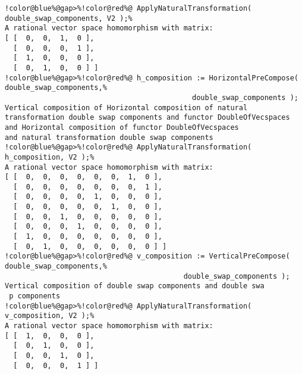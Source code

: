 \begin{Verbatim}[commandchars=!@\%,frame=single]
!color@blue%@gap>%!color@red%@ ApplyNaturalTransformation( double_swap_components, V2 );%
A rational vector space homomorphism with matrix: 
[ [  0,  0,  1,  0 ],
  [  0,  0,  0,  1 ],
  [  1,  0,  0,  0 ],
  [  0,  1,  0,  0 ] ]
!color@blue%@gap>%!color@red%@ h_composition := HorizontalPreCompose( double_swap_components,%
                                            double_swap_components );
Vertical composition of Horizontal composition of natural
transformation double swap components and functor DoubleOfVecspaces
and Horizontal composition of functor DoubleOfVecspaces
and natural transformation double swap components
!color@blue%@gap>%!color@red%@ ApplyNaturalTransformation( h_composition, V2 );%
A rational vector space homomorphism with matrix: 
[ [  0,  0,  0,  0,  0,  0,  1,  0 ],
  [  0,  0,  0,  0,  0,  0,  0,  1 ],
  [  0,  0,  0,  0,  1,  0,  0,  0 ],
  [  0,  0,  0,  0,  0,  1,  0,  0 ],
  [  0,  0,  1,  0,  0,  0,  0,  0 ],
  [  0,  0,  0,  1,  0,  0,  0,  0 ],
  [  1,  0,  0,  0,  0,  0,  0,  0 ],
  [  0,  1,  0,  0,  0,  0,  0,  0 ] ]
!color@blue%@gap>%!color@red%@ v_composition := VerticalPreCompose( double_swap_components,%
                                          double_swap_components );
Vertical composition of double swap components and double swa
 p components
!color@blue%@gap>%!color@red%@ ApplyNaturalTransformation( v_composition, V2 );%
A rational vector space homomorphism with matrix: 
[ [  1,  0,  0,  0 ],
  [  0,  1,  0,  0 ],
  [  0,  0,  1,  0 ],
  [  0,  0,  0,  1 ] ]
\end{Verbatim}
